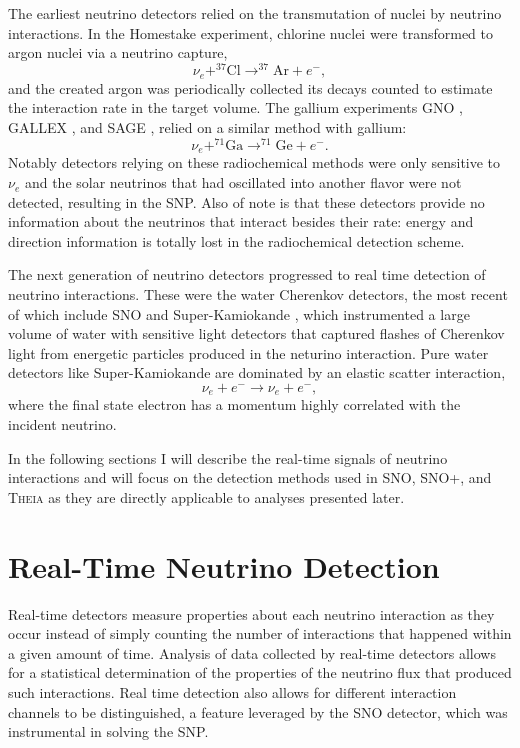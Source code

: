The earliest neutrino detectors relied on the transmutation of nuclei by neutrino interactions. 
In the Homestake \cite{homestake} experiment, chlorine nuclei were transformed to argon nuclei via a neutrino capture,
\begin{equation}
\nu_e + ^{37}\mathrm{Cl} \rightarrow ^{37}\mathrm{Ar} + e^-,
\end{equation}
and the created argon was periodically collected its decays counted to estimate the interaction rate in the target volume.
The gallium experiments GNO \cite{gno}, GALLEX \cite{gallex}, and SAGE \cite{sagecombo}, relied on a similar method with gallium:
\begin{equation}
\nu_e + ^{71}\mathrm{Ga} \rightarrow ^{71}\mathrm{Ge} + e^-.
\end{equation}
Notably detectors relying on these radiochemical methods were only sensitive to $\nu_e$ and the solar neutrinos that had oscillated into another flavor were not detected, resulting in the SNP.
Also of note is that these detectors provide no information about the neutrinos that interact besides their rate: energy and direction information is totally lost in the radiochemical detection scheme.

The next generation of neutrino detectors progressed to real time detection of neutrino interactions.
These were the water Cherenkov detectors, the most recent of which include SNO \cite{3phase} and Super-Kamiokande \cite{superk}, which instrumented a large volume of water with sensitive light detectors that captured flashes of Cherenkov light from energetic particles produced in the neturino interaction.
Pure water detectors like Super-Kamiokande are dominated by an elastic scatter interaction,
\begin{equation}
\nu_e + e^- \rightarrow \nu_e + e^-,
\end{equation}
where the final state electron has a momentum highly correlated with the incident neutrino.

In the following sections I will describe the real-time signals of neutrino interactions and will focus on the detection methods used in SNO, SNO+, and \textsc{Theia} as they are directly applicable to analyses presented later.

\section{Real-Time Neutrino Detection}

Real-time detectors measure properties about each neutrino interaction as they occur instead of simply counting the number of interactions that happened within a given amount of time.
Analysis of data collected by real-time detectors allows for a statistical determination of the properties of the neutrino flux that produced such interactions.
Real time detection also allows for different interaction channels to be distinguished, a feature leveraged by the SNO detector, which was instrumental in solving the SNP.

